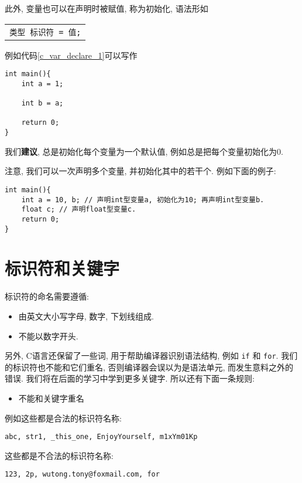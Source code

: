         此外, 变量也可以在声明时被赋值, 称为初始化, 语法形如
        \begin{center}
        \begin{longtable}{l}
            \texttt{类型~标识符 = 值;}
        \end{longtable}
        \end{center}

        例如代码\ref{c_var_declare_1}可以写作
\begin{lstlisting}
int main(){
    int a = 1;

    int b = a;

    return 0;
}
\end{lstlisting}

        我们\textbf{建议}, 总是初始化每个变量为一个默认值, 例如总是把每个变量初始化为0.

        注意, 我们可以一次声明多个变量, 并初始化其中的若干个. 例如下面的例子:
\begin{lstlisting}
int main(){
    int a = 10, b; // 声明int型变量a, 初始化为10; 再声明int型变量b.
    float c; // 声明float型变量c.
    return 0;
}
\end{lstlisting}
    
    \section{标识符和关键字} \label{标识符和关键字}
        标识符的命名需要遵循:
        \begin{itemize}
            \item 由英文大小写字母, 数字, 下划线组成.
            \item 不能以数字开头.
        \end{itemize}

        另外, C语言还保留了一些词, 用于帮助编译器识别语法结构, 例如 \texttt{if} 和 \texttt{for}. 我们的标识符也不能和它们重名, 否则编译器会误以为是语法单元, 而发生意料之外的错误. 我们将在后面的学习中学到更多关键字. 所以还有下面一条规则:
        \begin{itemize}
            \item 不能和关键字重名
        \end{itemize}

        例如这些都是合法的标识符名称:
        \begin{center}
            \texttt{abc, str1,  \_this\_one, EnjoyYourself, m1xYm01Kp}
        \end{center}
        
        这些都是不合法的标识符名称:
        \begin{center}
            \texttt{123, 2p, wutong.tony@foxmail.com, for}
        \end{center}

